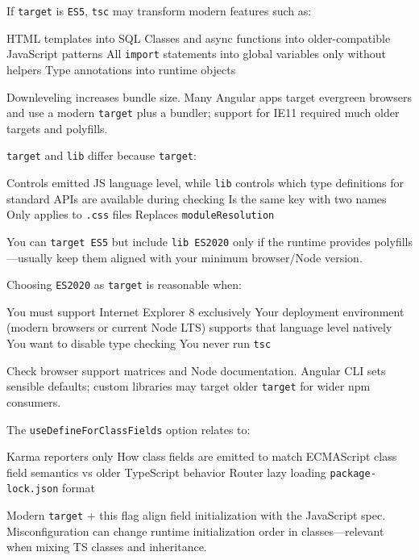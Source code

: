 \question[4]
If \texttt{target} is \texttt{ES5}, \texttt{tsc} may transform modern features such as:
\begin{choices}
  \choice HTML templates into SQL
  \CorrectChoice Classes and async functions into older-compatible JavaScript patterns
  \choice All \texttt{import} statements into global variables only without helpers
  \choice Type annotations into runtime objects
\end{choices}
\begin{solution}
  Downleveling increases bundle size. Many Angular apps target evergreen browsers and use a modern \texttt{target} plus a bundler; support for IE11 required much older targets and polyfills.
\end{solution}

\question[4]
\texttt{target} and \texttt{lib} differ because \texttt{target}:
\begin{choices}
  \CorrectChoice Controls emitted JS language level, while \texttt{lib} controls which type definitions for standard APIs are available during checking
  \choice Is the same key with two names
  \choice Only applies to \texttt{.css} files
  \choice Replaces \texttt{moduleResolution}
\end{choices}
\begin{solution}
  You can \texttt{target ES5} but include \texttt{lib ES2020} only if the runtime provides polyfills---usually keep them aligned with your minimum browser/Node version.
\end{solution}

\question[4]
Choosing \texttt{ES2020} as \texttt{target} is reasonable when:
\begin{choices}
  \choice You must support Internet Explorer 8 exclusively
  \CorrectChoice Your deployment environment (modern browsers or current Node LTS) supports that language level natively
  \choice You want to disable type checking
  \choice You never run \texttt{tsc}
\end{choices}
\begin{solution}
  Check browser support matrices and Node documentation. Angular CLI sets sensible defaults; custom libraries may target older \texttt{target} for wider npm consumers.
\end{solution}

\question[4]
The \texttt{useDefineForClassFields} option relates to:
\begin{choices}
  \choice Karma reporters only
  \CorrectChoice How class fields are emitted to match ECMAScript class field semantics vs older TypeScript behavior
  \choice Router lazy loading
  \choice \texttt{package-lock.json} format
\end{choices}
\begin{solution}
  Modern \texttt{target} + this flag align field initialization with the JavaScript spec. Misconfiguration can change runtime initialization order in classes---relevant when mixing TS classes and inheritance.
\end{solution}


